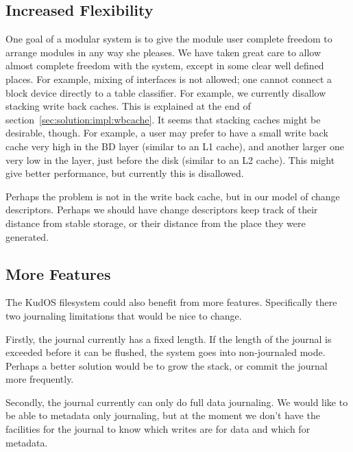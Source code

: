 \subsection{Increased Flexibility}


One goal of a modular system is to give the module user complete freedom to
arrange modules in any way she pleases. We have taken great care to allow
almost complete freedom with the system, except in some clear well defined
places. For example, mixing of interfaces is not allowed; one cannot
connect a block device directly to a table classifier. For example, we
currently disallow stacking write back caches. This is explained at the end
of section~\ref{sec:solution:impl:wbcache}. It seems that stacking caches
might be desirable, though. For example, a user may prefer to have a small
write back cache very high in the BD layer (similar to an L1 cache), and
another larger one very low in the layer, just before the disk (similar to
an L2 cache). This might give better performance, but currently this is
disallowed.

Perhaps the problem is not in the write back cache, but in our model of change
descriptors. Perhaps we should have change descriptors keep track of their
distance from stable storage, or their distance from the place they were
generated.

\subsection{More Features}

The KudOS filesystem could also benefit from more features.
Specifically there two journaling limitations that would be nice to
change.

Firstly, the journal currently has a fixed length. If the length of the
journal is exceeded before it can be flushed, the system goes into
non-journaled mode. Perhaps a better solution would be to grow the
stack, or commit the journal more frequently.

Secondly, the journal currently can only do full data journaling. We
would like to be able to metadata only journaling, but at the moment
we don't have the facilities for the journal to know which writes are
for data and which for metadata.
